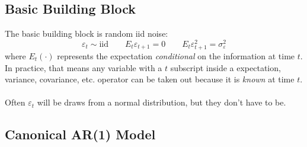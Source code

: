 \documentclass[a4paper,12pt]{scrartcl}
\begin{document}
\subsection{Basic Building Block}

The basic building block is random iid noise:
    \[ \varepsilon_t \sim \text{iid} \qquad
	E_t\varepsilon_{t+1} = 0 \qquad 
	E_t\varepsilon^2_{t+1} = \sigma_\varepsilon^2
    \]
where $E_t(\cdot)$ represents the expectation \emph{conditional} on
the information at time $t$. In practice, that means any variable
with a $t$ subscript inside a expectation, variance, covariance, etc.
operator can be taken out because it is \emph{known} at time $t$.
\\
\\
Often $\varepsilon_t$ will be draws
from a normal distribution, but they don't have to be.

\subsection{Canonical AR(1) Model}
\end{document}
